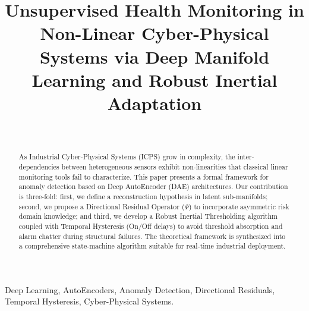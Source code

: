 \documentclass[journal]{IEEEtran}
\begin{document}
	
	\title{Unsupervised Health Monitoring in Non-Linear Cyber-Physical Systems via Deep Manifold Learning and Robust Inertial Adaptation}
	
	\author{
	 \\
}
	
	\maketitle
	
	\begin{abstract}
		As Industrial Cyber-Physical Systems (ICPS) grow in complexity, the inter-dependencies between heterogeneous sensors exhibit non-linearities that classical linear monitoring tools fail to characterize. This paper presents a formal framework for anomaly detection based on Deep AutoEncoder (DAE) architectures. Our contribution is three-fold: first, we define a reconstruction hypothesis in latent sub-manifolds; second, we propose a Directional Residual Operator ($\Psi$) to incorporate asymmetric risk domain knowledge; and third, we develop a Robust Inertial Thresholding algorithm coupled with Temporal Hysteresis (On/Off delays) to avoid threshold absorption and alarm chatter during structural failures. The theoretical framework is synthesized into a comprehensive state-machine algorithm suitable for real-time industrial deployment.
	\end{abstract}
	
	\begin{IEEEkeywords}
		Deep Learning, AutoEncoders, Anomaly Detection, Directional Residuals, Temporal Hysteresis, Cyber-Physical Systems.
	\end{IEEEkeywords}
	
\end{document}
